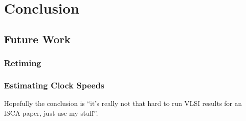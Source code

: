 \documentclass{article}
\begin{document}
\chapter{Conclusion}

\section{Future Work}

\subsection{Retiming}

\subsection{Estimating Clock Speeds}

Hopefully the conclusion is ``it's really not that hard to run VLSI results for
an ISCA paper, just use my stuff''.
\end{document}

